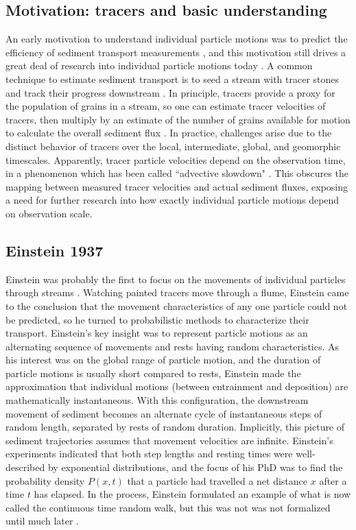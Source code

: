 \subsection{Motivation: tracers and basic understanding}
An early motivation to understand individual particle motions was to predict the efficiency of sediment transport measurements \citep{Ettema2004}, and this motivation still drives a great deal of research into individual particle motions today \citep{Hassan2017,Pretzlav2021}.
A common technique to estimate sediment transport is to seed a stream with tracer stones and track their progress downstream \citep{Einstein1937, Takayama1966, Ashmore2020}.
In principle, tracers provide a proxy for the population of grains in a stream, so one can estimate tracer velocities of tracers, then multiply by an estimate of the number of grains available for motion to calculate the overall sediment flux \citep{Wilcock1997,Ferguson2002}.
In practice, challenges arise due to the distinct behavior of tracers over the local, intermediate, global, and geomorphic timescales. Apparently, tracer particle velocities depend on the observation time, in a phenomenon which has been called ``advective slowdown" \citep{Ferguson2002,Haschenberger2012}. This obscures the mapping between measured tracer velocities and actual sediment fluxes, exposing a need for further research into how exactly individual particle motions depend on observation scale.

\subsection{Einstein 1937}
Einstein was probably the first to focus on the movements of individual particles through streams \citep{Einstein1937}.
Watching painted tracers move through a flume, Einstein came to the conclusion that the movement characteristics of any one particle could not be predicted, so he turned to probabilistic methods to characterize their transport.
Einstein's key insight was to represent particle motions as an alternating sequence of movements and rests having random characteristics.
As his interest was on the global range of particle motion, and the duration of particle motions is usually short compared to rests, Einstein made the approximation that individual motions (between entrainment and deposition) are mathematically instantaneous.
With this configuration, the downstream movement of sediment becomes an alternate cycle of instantaneous steps of random length, separated by rests of random duration. 
Implicitly, this picture of sediment trajectories assumes that movement velocities are infinite.
Einstein's experiments indicated that both step lengths and resting times were well-described by exponential distributions, and the focus of his PhD was to find the probability density $P(x,t)$ that a particle had travelled a net distance $x$ after a time $t$ has elapsed. In the process, Einstein formulated an example of what is now called the continuous time random walk, but this was not was not formalized until much later \citep{Montroll1965}.

